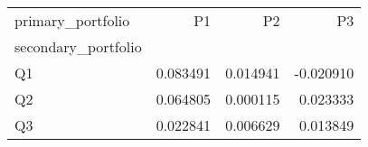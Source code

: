 \begin{tabular}{lrrr}
\toprule
primary_portfolio & P1 & P2 & P3 \\
secondary_portfolio &  &  &  \\
\midrule
Q1 & 0.083491 & 0.014941 & -0.020910 \\
Q2 & 0.064805 & 0.000115 & 0.023333 \\
Q3 & 0.022841 & 0.006629 & 0.013849 \\
\bottomrule
\end{tabular}
